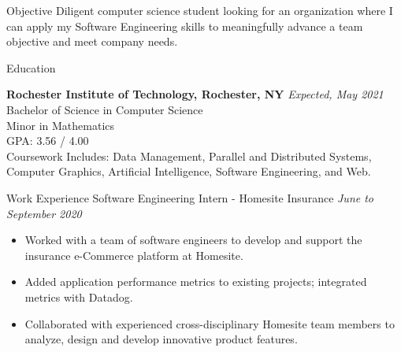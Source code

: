 \documentclass{resume} %
\begin{document}

\begin{rSection}{Objective}
Diligent computer science student looking for an organization where I can apply my Software Engineering skills to
 meaningfully advance a team objective and meet company needs. 
\end{rSection}

\begin{rSection}{Education}

{\bf Rochester Institute of Technology, Rochester, NY} \hfill {\em Expected, May 2021} 
\\ Bachelor of Science in Computer Science
\\ Minor in Mathematics
\\ GPA: 3.56 / 4.00
\\ Coursework Includes:  Data Management, Parallel and Distributed Systems, Computer Graphics, Artificial Intelligence, Software Engineering, and Web.

\end{rSection}


\begin{rSection}{Work Experience} 
Software Engineering Intern - Homesite Insurance \hfill {\em June to September 2020}
\begin{itemize}[noitemsep]
    \item Worked with a team of software engineers to develop and support the insurance e-Commerce platform at
    Homesite.
    \item Added application performance metrics to existing projects; integrated metrics with Datadog.
    \item Collaborated with experienced cross-disciplinary Homesite team members to analyze, design and develop innovative product features.
\end{itemize}
\end{rSection}
\end{document}

